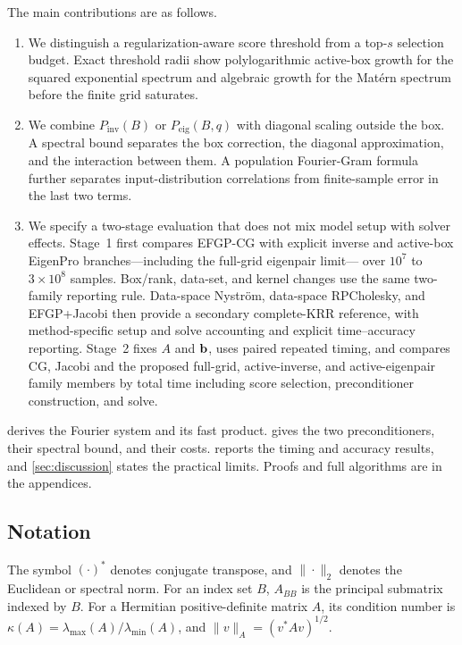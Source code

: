 The main contributions are as follows.
\begin{enumerate}
    \item We distinguish a regularization-aware score threshold from a
    top-\(s\) selection budget. Exact threshold radii show polylogarithmic
    active-box growth for the squared exponential spectrum and algebraic
    growth for the Mat\'ern spectrum before the finite grid saturates.

    \item We combine \(P_{\mathrm{inv}}(B)\) or
    \(P_{\mathrm{eig}}(B,q)\) with diagonal scaling outside the box. A
    spectral bound separates the box correction, the diagonal approximation,
    and the interaction between them. A population Fourier-Gram formula
    further separates input-distribution correlations from finite-sample error
    in the last two terms.

    \item We specify a two-stage evaluation that does not mix model setup with
    solver effects.  Stage~1 first compares EFGP-CG with explicit inverse and
    active-box EigenPro branches---including the full-grid eigenpair limit---
    over \(10^7\) to \(3\times10^8\) samples.  Box/rank, data-set, and kernel
    changes use the same two-family reporting rule.  Data-space Nystr\"om,
    data-space RPCholesky, and EFGP+Jacobi then provide a secondary complete-KRR
    reference, with method-specific setup and solve accounting and explicit
    time--accuracy reporting.  Stage~2
    fixes \(A\) and \(\mathbf b\), uses paired repeated timing, and compares CG,
    Jacobi and the proposed full-grid, active-inverse, and active-eigenpair
    family members by
    total time including score selection, preconditioner construction, and
    solve.
\end{enumerate}

 derives the Fourier system and its fast product.
 gives the two preconditioners, their spectral bound,
and their costs.  reports the timing and accuracy results,
and \cref{sec:discussion} states the practical limits. Proofs and full
algorithms are in the appendices.

\subsection{Notation}
\label{subsec:notation}

The symbol \((\cdot)^*\) denotes conjugate transpose, and \(\|\cdot\|_2\)
denotes the Euclidean or spectral norm. For an index set \(B\), \(A_{BB}\)
is the principal submatrix indexed by \(B\). For a Hermitian positive-definite
matrix \(A\), its condition number is
\(\kappa(A)=\lambda_{\max}(A)/\lambda_{\min}(A)\), and
\(\|v\|_A=(v^*Av)^{1/2}\).
